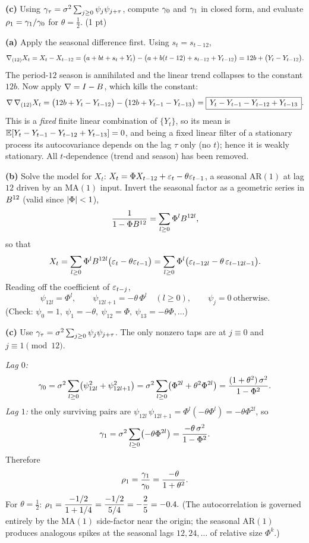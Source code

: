 \documentclass[11pt]{article}
\begin{document}
\textbf{(c)} Using $\gamma_\tau=\sigma^{2}\sum_{j\ge0}\psi_j\psi_{j+\tau}$, compute $\gamma_0$ and $\gamma_1$ in closed form, and evaluate $\rho_1=\gamma_1/\gamma_0$ for $\theta=\tfrac12$. \hfill(1 pt)
\statementend

\textbf{(a)} Apply the seasonal difference first. Using $s_t=s_{t-12}$,
\[
\nabla_{(12)}X_t=X_t-X_{t-12}
=\bigl(a+bt+s_t+Y_t\bigr)-\bigl(a+b(t-12)+s_{t-12}+Y_{t-12}\bigr)
=12b+\bigl(Y_t-Y_{t-12}\bigr).
\]
The period-$12$ season is annihilated and the linear trend collapses to the constant $12b$. Now apply $\nabla=I-B$, which kills the constant:
\[
\nabla\,\nabla_{(12)}X_t
=\bigl(12b+Y_t-Y_{t-12}\bigr)-\bigl(12b+Y_{t-1}-Y_{t-13}\bigr)
=\boxed{\,Y_t-Y_{t-1}-Y_{t-12}+Y_{t-13}\,}.
\]
This is a \emph{fixed} finite linear combination of $\{Y_t\}$, so its mean is
$\mathbb{E}[Y_t-Y_{t-1}-Y_{t-12}+Y_{t-13}]=0$, and being a fixed linear filter of a stationary process its autocovariance depends on the lag $\tau$ only (no $t$); hence it is weakly stationary. All $t$-dependence (trend and season) has been removed.

\textbf{(b)} Solve the model for $X_t$: $X_t=\Phi X_{t-12}+\varepsilon_t-\theta\varepsilon_{t-1}$, a seasonal $\mathrm{AR}(1)$ at lag $12$ driven by an $\mathrm{MA}(1)$ input. Invert the seasonal factor as a geometric series in $B^{12}$ (valid since $\left\lvert \Phi \right\rvert<1$),
\[
\frac{1}{1-\Phi B^{12}}=\sum_{l\ge0}\Phi^{l}B^{12l},
\]
so that
\[
X_t=\sum_{l\ge0}\Phi^{l}B^{12l}\bigl(\varepsilon_t-\theta\varepsilon_{t-1}\bigr)
=\sum_{l\ge0}\Phi^{l}\bigl(\varepsilon_{t-12l}-\theta\,\varepsilon_{t-12l-1}\bigr).
\]
Reading off the coefficient of $\varepsilon_{t-j}$,
\[
\boxed{\;\psi_{12l}=\Phi^{l},\qquad \psi_{12l+1}=-\theta\,\Phi^{l}\quad(l\ge0),\qquad \psi_j=0\ \text{otherwise.}\;}
\]
(Check: $\psi_0=1,\ \psi_1=-\theta,\ \psi_{12}=\Phi,\ \psi_{13}=-\theta\Phi,\dots$)

\textbf{(c)} Use $\gamma_\tau=\sigma^{2}\sum_{j\ge0}\psi_j\psi_{j+\tau}$. The only nonzero taps are at $j\equiv0$ and $j\equiv1\pmod{12}$.

\emph{Lag $0$:}
\[
\gamma_0=\sigma^{2}\sum_{l\ge0}\bigl(\psi_{12l}^{2}+\psi_{12l+1}^{2}\bigr)
=\sigma^{2}\sum_{l\ge0}\bigl(\Phi^{2l}+\theta^{2}\Phi^{2l}\bigr)
=\frac{(1+\theta^{2})\,\sigma^{2}}{1-\Phi^{2}} .
\]
\emph{Lag $1$:} the only surviving pairs are $\psi_{12l}\,\psi_{12l+1}=\Phi^{l}(-\theta\Phi^{l})=-\theta\Phi^{2l}$, so
\[
\gamma_1=\sigma^{2}\sum_{l\ge0}\bigl(-\theta\Phi^{2l}\bigr)=\frac{-\theta\,\sigma^{2}}{1-\Phi^{2}} .
\]
Therefore
\[
\rho_1=\frac{\gamma_1}{\gamma_0}=\frac{-\theta}{1+\theta^{2}} .
\]
For $\theta=\tfrac12$: $\rho_1=\dfrac{-1/2}{1+1/4}=\dfrac{-1/2}{5/4}=-\dfrac{2}{5}=-0.4.$ (The autocorrelation is governed entirely by the $\mathrm{MA}(1)$ side-factor near the origin; the seasonal $\mathrm{AR}(1)$ produces analogous spikes at the seasonal lags $12,24,\dots$ of relative size $\Phi^{k}$.)
\end{document}
